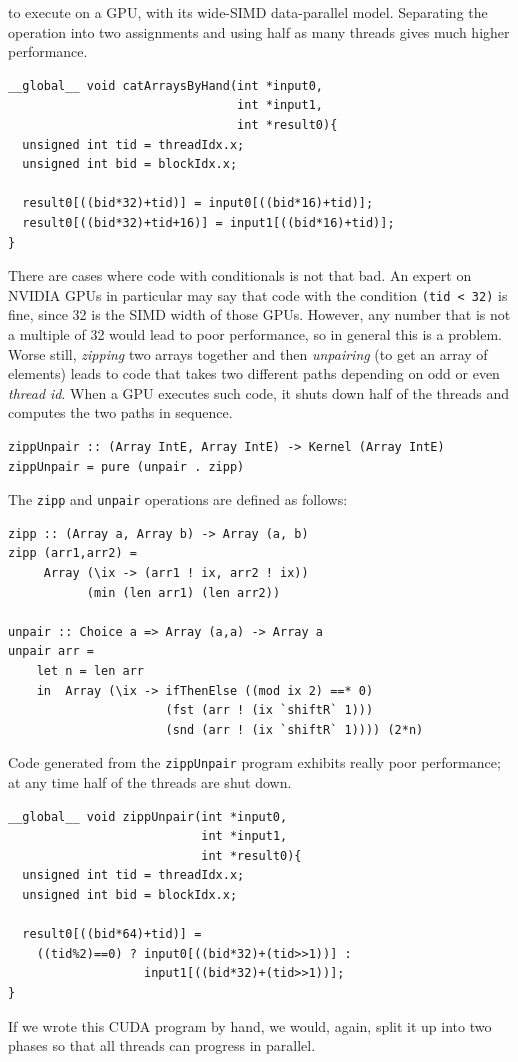 \documentclass[]{sigplanconf}
\begin{document}
to execute on a GPU, with its wide-SIMD data-parallel model. Separating
the operation into two assignments and using half as many threads gives
much higher performance.
\begin{codesize}
\begin{verbatim}
__global__ void catArraysByHand(int *input0,
                                int *input1,
                                int *result0){
  unsigned int tid = threadIdx.x;
  unsigned int bid = blockIdx.x;
  
  result0[((bid*32)+tid)] = input0[((bid*16)+tid)];
  result0[((bid*32)+tid+16)] = input1[((bid*16)+tid)];  
}
\end{verbatim}
\end{codesize}
There are cases where code with conditionals is not that bad. 
An expert on NVIDIA GPUs in particular may say that code with 
the condition {\tt (tid < 32)} is fine, since 32 is the SIMD width 
of those GPUs. However, any number that is not a multiple of 32 would 
lead to poor performance, so in general this is a problem. 
 Worse still, {\em zipping} two arrays together and then 
{\em unpairing} (to get an array of elements)
leads to code that takes two different paths depending 
on odd or even {\em thread id}. When a GPU executes such code, it 
shuts down half of the threads and computes the two paths in sequence. 
\begin{codesize}
\begin{verbatim}
zippUnpair :: (Array IntE, Array IntE) -> Kernel (Array IntE) 
zippUnpair = pure (unpair . zipp)
\end{verbatim}
\end{codesize}
The {\tt zipp} and {\tt unpair} operations are defined as follows: 
\begin{codesize}
\begin{verbatim}
zipp :: (Array a, Array b) -> Array (a, b)             
zipp (arr1,arr2) = 
     Array (\ix -> (arr1 ! ix, arr2 ! ix)) 
           (min (len arr1) (len arr2))

unpair :: Choice a => Array (a,a) -> Array a
unpair arr = 
    let n = len arr
    in  Array (\ix -> ifThenElse ((mod ix 2) ==* 0) 
                      (fst (arr ! (ix `shiftR` 1)))
                      (snd (arr ! (ix `shiftR` 1)))) (2*n)
\end{verbatim}
\end{codesize}
Code generated from the {\tt zippUnpair} program exhibits really 
poor performance; at any time half of the threads are shut down. 
\begin{codesize}
\begin{verbatim}
__global__ void zippUnpair(int *input0,
                           int *input1,
                           int *result0){
  unsigned int tid = threadIdx.x;
  unsigned int bid = blockIdx.x;
  
  result0[((bid*64)+tid)] = 
    ((tid%2)==0) ? input0[((bid*32)+(tid>>1))] : 
                   input1[((bid*32)+(tid>>1))];
}
\end{verbatim}
\end{codesize}
If we wrote this CUDA program by hand, we would, again, split it up into 
two phases so that all threads can progress in parallel.  
\end{document}
